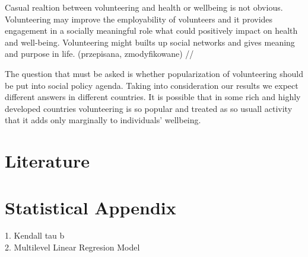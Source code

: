 \documentclass[10pt, letterpaper]{article}
\begin{document}
\begin{spacing}{1.4}
Casual realtion between volunteering  and health or wellbeing is not obvious. Volunteering may improve the employability of volunteers and it provides engagement in a socially meaningful role  what could positively impact on health and well-being. Volunteering might builts up social networks and gives meaning and purpose in life. (przepisana, zmodyfikowane) //

The question that must be asked is whether popularization of volunteering should be put into social policy agenda. Taking into consideration our results we expect different answers in different countries. It is possible that in some rich and highly developed countries volunteering is so popular and treated as so usuall activity that it adds only marginally to individuals' wellbeing. 

\section{Literature}


\section{Statistical Appendix}

1. Kendall tau b \\
2. Multilevel Linear Regresion Model

\end{spacing}
\end{document}
